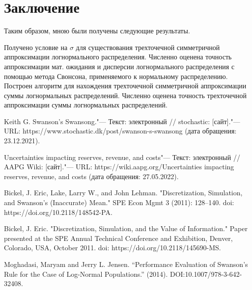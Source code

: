 \documentclass[12pt]{article}
\begin{document}
	
	\section{Заключение}
	
	Таким образом, мною были получены следующие результаты. 
	
	Получено условие на $\sigma$ для существования трехточечной симметричной аппроксимации логнормального распределения.
	Численно оценена точность аппроксимации мат. ожидания и дисперсии логнормального распределения с помощью метода Свонсона, применяемого к нормальному распределению.
	Построен алгоритм для нахождения трехточечной симметричной аппроксимации суммы логнормальных распределений.
	Численно оценена точность трехточечной аппроксимации суммы логнормальных распределений.
	
	\begin{thebibliography}{1}
		 Keith G. Swanson's Swansong."--- Текст: электронный // stochastic: [сайт]."--- URL: https://www.stochastic.dk/post/swanson-s-swansong (дата обращения: 23.12.2021).
		
		 Uncertainties impacting reserves, revenue, and costs"--- Текст: электронный // AAPG Wiki: [сайт]."--- URL: https://wiki.aapg.org/Uncertainties impacting reserves, revenue, and costs (дата обращения: 27.05.2022).
		
		 Bickel, J. Eric, Lake, Larry W., and John Lehman. "Discretization, Simulation, and Swanson's (Inaccurate) Mean." SPE Econ Mgmt 3 (2011): 128–140. doi: https://doi.org/10.2118/148542-PA.
		
		 Bickel, J. Eric. "Discretization, Simulation, and the Value of Information." Paper presented at the SPE Annual Technical Conference and Exhibition, Denver, Colorado, USA, October 2011. doi: https://doi.org/10.2118/145690-MS.
		
		 Moghadasi, Maryam and Jerry L. Jensen. “Performance Evaluation of Swanson’s Rule for the Case of Log-Normal Populations.” (2014). DOI:10.1007/978-3-642-32408.
		
		
	\end{thebibliography}
	
	
	
	
	
\end{document}
